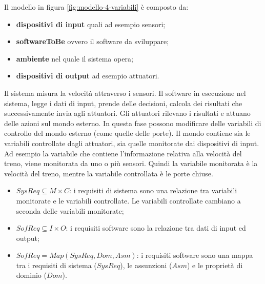 \documentclass[italian]{article}
\begin{document}
	Il modello in figura \ref{fig:modello-4-variabili} è composto da:
	\begin{itemize}
		\item \textbf{dispositivi di input} quali ad esempio sensori;
		\item \textbf{softwareToBe} ovvero il software da sviluppare;
		\item \textbf{ambiente} nel quale il sistema opera;
		\item \textbf{dispositivi di output} ad esempio attuatori.
	\end{itemize}
	Il sistema misura la velocità attraverso i sensori. Il software in esecuzione nel sistema, legge i dati di input, prende delle decisioni, calcola dei risultati che successivamente invia agli attuatori. Gli attuatori rilevano i risultati e attuano delle azioni sul mondo esterno. In questa fase possono modificare delle variabili di controllo del mondo esterno (come quelle delle porte). Il mondo contiene sia le variabili controllate dagli attuatori, sia quelle monitorate dai dispositivi di input. Ad esempio la variabile che contiene l'informazione relativa alla velocità del treno, viene monitorata da uno o più sensori. Quindi la variabile monitorata è la velocità del treno, mentre la variabile controllata è le porte chiuse.
	\begin{itemize}
		\item 	$SysReq \subseteq M \times C$: i requisiti di sistema sono una relazione tra variabili monitorate e le variabili controllate. Le variabili controllate cambiano a seconda delle variabili monitorate;
		\item $SofReq \subseteq I \times O$: i requisiti software sono la relazione tra dati di input ed output;
		\item $SofReq = Map(SysReq, Dom, Asm)$: i requisiti software sono una mappa tra i requisiti di sistema ($SysReq$), le assunzioni ($Asm$) e le proprietà di dominio ($Dom$).
	\end{itemize}
\end{document}
